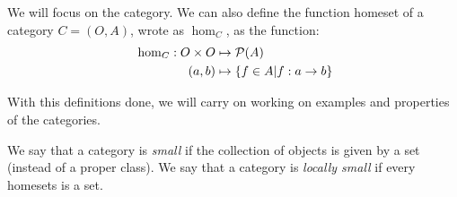 We will focus on the category. We can also define the function homeset of a category $C=(O,A)$, wrote as $\hom_{C}$, as the function:
\begin{align*}
  && \hom_{C}: O \times O &\mapsto \mathcal{P}(A)&\\
  \displaystyle &\ &(a,b)&\mapsto \{f\in A | f:a\to b\}&
\end{align*}

With this definitions done, we will carry on working on examples and properties of the categories.

\begin{definition}
  We say that a category is \emph{small} if the collection of objects is given by a set (instead of a proper class). We say that a category is \emph{locally small} if every homesets is a set.
\end{definition}

